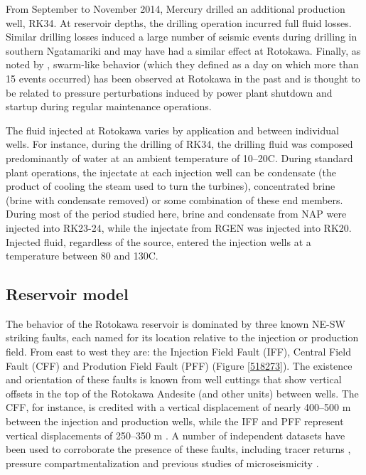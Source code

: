 From September to November 2014, Mercury drilled an additional production well, RK34. At reservoir depths, the drilling operation incurred full fluid losses. Similar drilling losses induced a large number of seismic events during drilling in southern Ngatamariki \citep{j2019} and may have had a similar effect at Rotokawa. Finally, as noted by \citet{Sewell_2015WGC}, swarm-like behavior (which they defined as a day on which more than 15 events occurred) has been observed at Rotokawa in the past and is thought to be related to pressure perturbations induced by power plant shutdown and startup during regular maintenance operations.

The fluid injected at Rotokawa varies by application and between individual wells. For instance, during the drilling of RK34, the drilling fluid was composed predominantly of water at an ambient temperature of 10--20\textdegree C. During standard plant operations, the injectate at each injection well can be condensate (the product of cooling the steam used to turn the turbines), concentrated brine (brine with condensate removed) or some combination of these end members. During most of the period studied here, brine and condensate from NAP were injected into RK23-24, while the injectate from RGEN was injected into RK20. Injected fluid, regardless of the source, entered the injection wells at a temperature between 80 and 130\textdegree C.

\subsection{Reservoir model}\label{model}
The behavior of the Rotokawa reservoir is dominated by three known NE-SW striking faults, each named for its location relative to the injection or production field. From east to west they are: the Injection Field Fault (IFF), Central Field Fault (CFF) and Prodution Field Fault (PFF) \citep{wallis2013} (Figure \ref{518273}). The existence and orientation of these faults is known from well cuttings that show vertical offsets in the top of the Rotokawa Andesite (and other units) between wells. The CFF, for instance, is credited with a vertical displacement of nearly 400--500 m between the injection and production wells, while the IFF and PFF represent vertical displacements of 250--350 m \citep{wallis2013}. A number of independent datasets have been used to corroborate the presence of these faults, including tracer returns \citep{addison2015rotokawa,Addison_2017stanford}, pressure compartmentalization \citep{Quinao_2013stanford,Sewell_2015} and previous studies of microseismicity \citep{Sherburn_2015,Sewell_2015WGC}.

